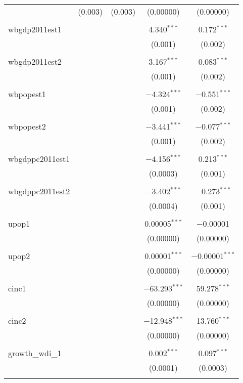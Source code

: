 \begin{table}[!htbp]
\begin{tabular}{@{\extracolsep{5pt}}lcccc}
  & (0.003) & (0.003) & (0.00000) & (0.00000) \\ 
  & & & & \\ 
 wbgdp2011est1 &  &  & 4.340$^{***}$ & 0.172$^{***}$ \\ 
  &  &  & (0.001) & (0.002) \\ 
  & & & & \\ 
 wbgdp2011est2 &  &  & 3.167$^{***}$ & 0.083$^{***}$ \\ 
  &  &  & (0.001) & (0.002) \\ 
  & & & & \\ 
 wbpopest1 &  &  & $-$4.324$^{***}$ & $-$0.551$^{***}$ \\ 
  &  &  & (0.001) & (0.002) \\ 
  & & & & \\ 
 wbpopest2 &  &  & $-$3.441$^{***}$ & $-$0.077$^{***}$ \\ 
  &  &  & (0.001) & (0.002) \\ 
  & & & & \\ 
 wbgdppc2011est1 &  &  & $-$4.156$^{***}$ & 0.213$^{***}$ \\ 
  &  &  & (0.0003) & (0.001) \\ 
  & & & & \\ 
 wbgdppc2011est2 &  &  & $-$3.402$^{***}$ & $-$0.273$^{***}$ \\ 
  &  &  & (0.0004) & (0.001) \\ 
  & & & & \\ 
 upop1 &  &  & 0.00005$^{***}$ & $-$0.00001 \\ 
  &  &  & (0.00000) & (0.00000) \\ 
  & & & & \\ 
 upop2 &  &  & 0.00001$^{***}$ & $-$0.00001$^{***}$ \\ 
  &  &  & (0.00000) & (0.00000) \\ 
  & & & & \\ 
 cinc1 &  &  & $-$63.293$^{***}$ & 59.278$^{***}$ \\ 
  &  &  & (0.00000) & (0.00000) \\ 
  & & & & \\ 
 cinc2 &  &  & $-$12.948$^{***}$ & 13.760$^{***}$ \\ 
  &  &  & (0.00000) & (0.00000) \\ 
  & & & & \\ 
 growth\_wdi\_1 &  &  & 0.002$^{***}$ & 0.097$^{***}$ \\ 
  &  &  & (0.0001) & (0.0003) \\ 
  & & & & \\ 

\end{tabular}
\end{table}
